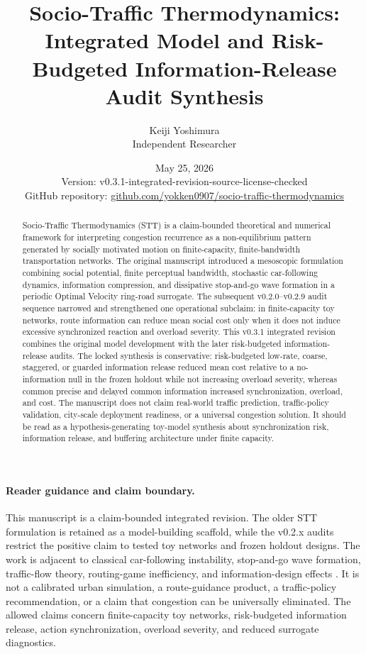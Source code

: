 \documentclass[11pt]{article}
\title{\vspace{-1.5em}\textbf{Socio-Traffic Thermodynamics:}\\[0.25em]
\large Integrated Model and Risk-Budgeted Information-Release\\[0.15em]
\large Audit Synthesis}
\author{Keiji Yoshimura\\\small Independent Researcher}
\date{May 25, 2026\\[0.35em]
\small Version: v0.3.1-integrated-revision-source-license-checked\\
\small GitHub repository: \href{https://github.com/yokken0907/socio-traffic-thermodynamics}{github.com/yokken0907/socio-traffic-thermodynamics}}
\begin{document}
\maketitle

\begin{abstract}
Socio-Traffic Thermodynamics (STT) is a claim-bounded theoretical and numerical framework for interpreting congestion recurrence as a non-equilibrium pattern generated by socially motivated motion on finite-capacity, finite-bandwidth transportation networks. The original manuscript introduced a mesoscopic formulation combining social potential, finite perceptual bandwidth, stochastic car-following dynamics, information compression, and dissipative stop-and-go wave formation in a periodic Optimal Velocity ring-road surrogate. The subsequent v0.2.0--v0.2.9 audit sequence narrowed and strengthened one operational subclaim: in finite-capacity toy networks, route information can reduce mean social cost only when it does not induce excessive synchronized reaction and overload severity. This v0.3.1 integrated revision combines the original model development with the later risk-budgeted information-release audits. The locked synthesis is conservative: risk-budgeted low-rate, coarse, staggered, or guarded information release reduced mean cost relative to a no-information null in the frozen holdout while not increasing overload severity, whereas common precise and delayed common information increased synchronization, overload, and cost. The manuscript does not claim real-world traffic prediction, traffic-policy validation, city-scale deployment readiness, or a universal congestion solution. It should be read as a hypothesis-generating toy-model synthesis about synchronization risk, information release, and buffering architecture under finite capacity.
\end{abstract}

\paragraph{Reader guidance and claim boundary.}
This manuscript is a claim-bounded integrated revision. The older STT formulation is retained as a model-building scaffold, while the v0.2.x audits restrict the positive claim to tested toy networks and frozen holdout designs. The work is adjacent to classical car-following instability, stop-and-go wave formation, traffic-flow theory, routing-game inefficiency, and information-design effects \cite{Bando1995,Sugiyama2008,Helbing2001,Roughgarden2003,Acemoglu2018,Das2017}. It is not a calibrated urban simulation, a route-guidance product, a traffic-policy recommendation, or a claim that congestion can be universally eliminated. The allowed claims concern finite-capacity toy networks, risk-budgeted information release, action synchronization, overload severity, and reduced surrogate diagnostics.
\end{document}
